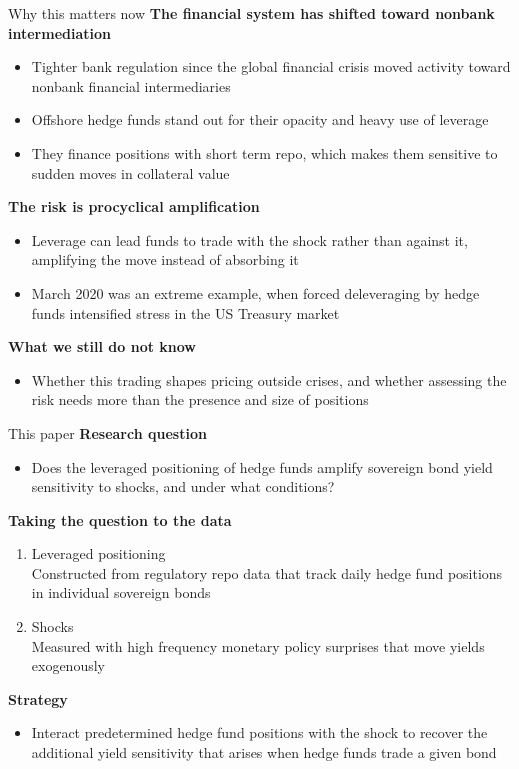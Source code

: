 \documentclass[aspectratio=169,10pt]{beamer}
\def\hibl{\textcolor{goetheblue}}
\def\hird{\textcolor{accentred}}
\newcommand{\svs}{\vspace{0.18cm}}
\newcommand{\bit}{\begin{itemize}}
\newcommand{\eit}{\end{itemize}}
\newcommand{\ben}{\begin{enumerate}}
\newcommand{\een}{\end{enumerate}}
\newcommand{\lead}[1]{{\bfseries #1}\par\nopagebreak}
\begin{document}
\begin{frame}{Why this matters now}
\svs
\lead{The financial system has shifted toward nonbank intermediation}
\bit\itemsep3pt
  \item Tighter bank regulation since the global financial crisis moved activity toward nonbank financial intermediaries {\scriptsize\color{softgrey}\citep{pelizzon2025nbfi}}
  \item Offshore hedge funds stand out for their \hird{opacity} and heavy use of \hird{leverage} {\scriptsize\color{softgrey}\citep{barth2025cross, aramonte2023}}
  \item They finance positions with short term repo, which makes them sensitive to sudden moves in collateral value
\eit
\svs
\lead{The risk is procyclical amplification}
\bit\itemsep3pt
  \item Leverage can lead funds to trade with the shock rather than against it, amplifying the move instead of absorbing it
  \item March 2020 was an extreme example, when forced deleveraging by hedge funds intensified stress in the US Treasury market {\scriptsize\color{softgrey}\citep{barth2025, kruttli2025}}
\eit
\svs
\lead{What we still do not know}
\bit
  \item Whether this trading shapes pricing \hibl{outside crises}, and whether assessing the risk needs more than the presence and size of positions
\eit
\end{frame}

\begin{frame}{This paper}
\svs
\lead{Research question}
\bit
  \item Does the \hibl{leveraged positioning} of hedge funds amplify sovereign bond yield sensitivity to \hibl{shocks}, and under what conditions?
\eit
\svs
\lead{Taking the question to the data}
\ben\itemsep3pt
  \item Leveraged positioning \\
        {\footnotesize Constructed from regulatory repo data that track daily hedge fund positions in individual sovereign bonds}
  \item Shocks \\
        {\footnotesize Measured with high frequency monetary policy surprises that move yields exogenously {\scriptsize\color{softgrey}\citep{altavilla2019}}}
\een
\svs
\lead{Strategy}
\bit
  \item Interact \hibl{predetermined} hedge fund positions with the shock to recover the additional yield sensitivity that arises when hedge funds trade a given bond
\eit
\end{frame}
\end{document}
